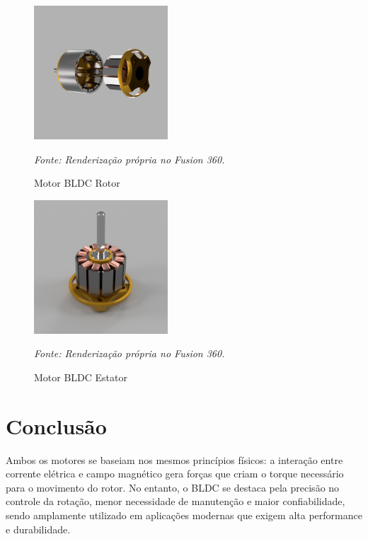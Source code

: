 \documentclass[11pt]{article}
\begin{document}
    \begin{multicols}{2}
    
    \begin{figure}[H]
        \centering
        \includegraphics[width=5cm]{Renderizações/2 - BLDC.png}
        \caption{Motor BLDC Rotor}
        \footnotesize \textit{Fonte: Renderização própria no Fusion 360.}
        \label{2-BLDC}
    \end{figure}

    \begin{figure}[H]
        \centering
        \includegraphics[width=5cm]{Renderizações/3 - BLDC.png}
        \caption{Motor BLDC Estator}
        \footnotesize \textit{Fonte: Renderização própria no Fusion 360.}
        \label{3-BLDC}
    \end{figure}

    \end{multicols}

\section{Conclusão}
    \noindent Ambos os motores se baseiam nos mesmos princípios físicos: a interação entre corrente elétrica e campo magnético gera forças que criam o torque necessário para o movimento 
    do rotor. No entanto, o BLDC se destaca pela precisão no controle da rotação, menor necessidade de manutenção e maior confiabilidade, sendo amplamente utilizado em aplicações modernas 
    que exigem alta performance e durabilidade.
\end{document}
